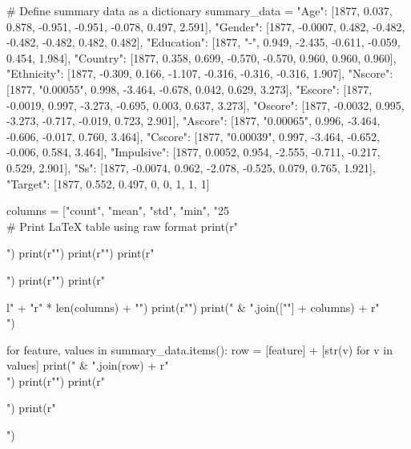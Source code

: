 \documentclass{article}
\begin{document}
\begin{pycode}
# Define summary data as a dictionary
summary_data = {
    "Age":         [1877, 0.037, 0.878, -0.951, -0.951, -0.078, 0.497, 2.591],
    "Gender":      [1877, -0.0007, 0.482, -0.482, -0.482, -0.482, 0.482, 0.482],
    "Education":   [1877, "-", 0.949, -2.435, -0.611, -0.059, 0.454, 1.984],
    "Country":     [1877, 0.358, 0.699, -0.570, -0.570, 0.960, 0.960, 0.960],
    "Ethnicity":   [1877, -0.309, 0.166, -1.107, -0.316, -0.316, -0.316, 1.907],
    "Nscore":      [1877, "0.00055", 0.998, -3.464, -0.678, 0.042, 0.629, 3.273],
    "Escore":      [1877, -0.0019, 0.997, -3.273, -0.695, 0.003, 0.637, 3.273],
    "Oscore":      [1877, -0.0032, 0.995, -3.273, -0.717, -0.019, 0.723, 2.901],
    "Ascore":      [1877, "0.00065", 0.996, -3.464, -0.606, -0.017, 0.760, 3.464],
    "Cscore":      [1877, "0.00039", 0.997, -3.464, -0.652, -0.006, 0.584, 3.464],
    "Impulsive":   [1877, 0.0052, 0.954, -2.555, -0.711, -0.217, 0.529, 2.901],
    "Ss":          [1877, -0.0074, 0.962, -2.078, -0.525, 0.079, 0.765, 1.921],
    "Target":      [1877, 0.552, 0.497, 0, 0, 1, 1, 1]
    }

columns = ["count", "mean", "std", "min", "25\\%

# Print LaTeX table using raw format
print(r"\begin{table}[h!]")
print(r"\centering")
print(r"\small")
print(r"\caption{Summary statistics of features and target variable}")
print(r"\label{tab:summary_statistics}")
print(r"\begin{tabular}{l" + "r" * len(columns) + "}")
print(r"\toprule")
print(" & ".join([""] + columns) + r" \\ \midrule")

for feature, values in summary_data.items():
    row = [feature] + [str(v) for v in values]
    print(" & ".join(row) + r" \\")
print(r"\bottomrule")
print(r"\end{tabular}")
print(r"\end{table}")
\end{pycode}
\end{document}
